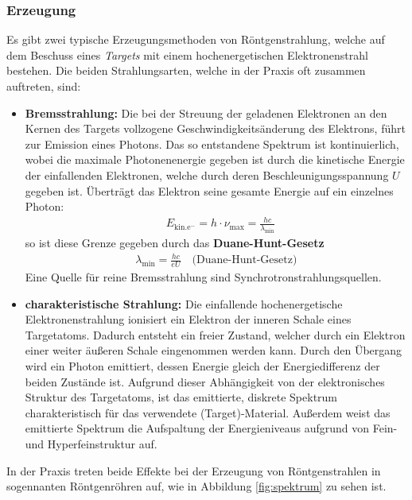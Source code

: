 \documentclass[11pt, a4paper]{article}
\begin{document}
\subsubsection{Erzeugung}
\label{sec:röntgenerzeugung}
Es gibt zwei typische Erzeugungsmethoden von Röntgenstrahlung, welche auf dem Beschuss eines \emph{Targets} mit einem hochenergetischen Elektronenstrahl bestehen.
Die beiden Strahlungsarten, welche in der Praxis oft zusammen auftreten, sind:
\begin{itemize}
  \item \textbf{Bremsstrahlung:} Die bei der Streuung der geladenen Elektronen an den Kernen des Targets vollzogene Geschwindigkeitsänderung des Elektrons, führt zur Emission eines Photons.
  Das so entstandene Spektrum ist kontinuierlich, wobei die maximale Photonenenergie gegeben ist durch die kinetische Energie der einfallenden Elektronen, welche durch deren Beschleunigungsspannung $U$ gegeben ist.
  Überträgt das Elektron seine gesamte Energie auf ein einzelnes Photon:
  \begin{align}
    &E_\mathrm{kin. e^-} = h \cdot \nu_\mathrm{max} = \frac{hc}{\lambda_\mathrm{min}}
  \end{align}
  so ist diese Grenze gegeben durch das \textbf{Duane-Hunt-Gesetz}
  \begin{align}
    \lambda_\mathrm{min} = \frac{h c}{e U} \quad \text{(Duane-Hunt-Gesetz)}
  \end{align}
  Eine Quelle für reine Bremsstrahlung sind Synchrotronstrahlungsquellen.

  \item \textbf{charakteristische Strahlung:} Die einfallende hochenergetische Elektronenstrahlung ionisiert ein Elektron der inneren Schale eines Targetatoms.
  Dadurch entsteht ein freier Zustand, welcher durch ein Elektron einer weiter äußeren Schale eingenommen werden kann.
  Durch den Übergang wird ein Photon emittiert, dessen Energie gleich der Energiedifferenz der beiden Zustände ist.
  Aufgrund dieser Abhängigkeit von der elektronisches Struktur des Targetatoms, ist das emittierte, diskrete Spektrum charakteristisch für das verwendete (Target)-Material.
  Außerdem weist das emittierte Spektrum die Aufspaltung der Energieniveaus aufgrund von Fein- und Hyperfeinstruktur auf.
\end{itemize}
In der Praxis treten beide Effekte bei der Erzeugung von Röntgenstrahlen in sogennanten Röntgenröhren auf, wie in Abbildung \ref{fig:spektrum} zu sehen ist.
\end{document}

